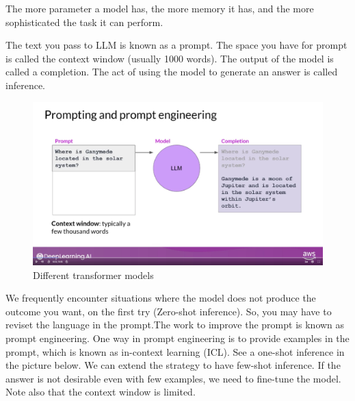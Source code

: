 \documentclass[12pt]{report}
\begin{document}
The more parameter a model has, the more memory it has, and the more sophisticated the task it can perform.

The text you pass to LLM is known as a prompt. The space you have for prompt is called the context window (usually 1000 words). The output of the model is called a completion. The act of using the model to generate an answer is called inference.

\begin{figure}[H]
  \centering
  \caption{Different transformer models}
  \includegraphics[trim=3cm 7cm 5cm 0cm,clip,scale=0.15]{pics/prompt.png}
\end{figure}

We frequently encounter situations where the model does not produce the outcome you want, on the first try (Zero-shot inference). So, you may have to reviset the language in the prompt.The work to improve the prompt is known as prompt engineering. One way in prompt engineering is to provide examples in the prompt, which is known as in-context learning (ICL). See a one-shot inference in the picture below. We can extend the strategy to have few-shot inference. If the answer is not desirable even with few examples, we need to fine-tune the model. Note also that the context window is limited.
\end{document}
